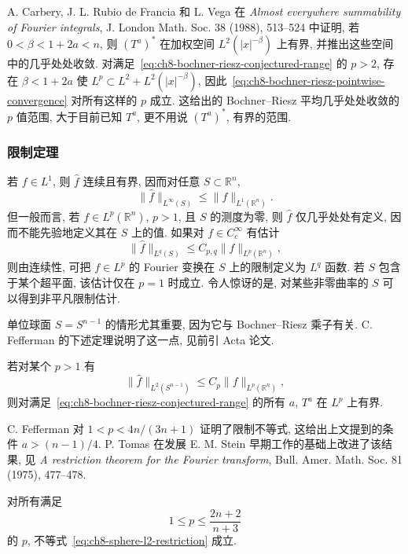 A. Carbery, J. L. Rubio de Francia 和 L. Vega 在 \textit{Almost everywhere summability of Fourier integrals}, J. London Math. Soc. 38 (1988), 513--524 中证明, 若 $0<\beta<1+2a<n$, 则 $(T^a)^*$ 在加权空间 $L^2(|x|^{-\beta})$ 上有界, 并推出这些空间中的几乎处处收敛. 对满足~\eqref{eq:ch8-bochner-riesz-conjectured-range} 的 $p>2$, 存在 $\beta<1+2a$ 使 $L^p\subset L^2+L^2(|x|^{-\beta})$, 因此~\eqref{eq:ch8-bochner-riesz-pointwise-convergence} 对所有这样的 $p$ 成立. 这给出的 Bochner--Riesz 平均几乎处处收敛的 $p$ 值范围, 大于目前已知 $T^a$, 更不用说 $(T^a)^*$, 有界的范围.

\subsubsection{限制定理}
\label{subsec:ch8-restriction-theorems}

若 $f\in L^1$, 则 $\widehat f$ 连续且有界, 因而对任意 $S\subset\mathbb R^n$,
\[
 \|\widehat f\|_{L^\infty(S)}\le\|f\|_{L^1(\mathbb R^n)}.
\]
但一般而言, 若 $f\in L^p(\mathbb R^n)$, $p>1$, 且 $S$ 的测度为零, 则 $\widehat f$ 仅几乎处处有定义, 因而不能先验地定义其在 $S$ 上的值. 如果对 $f\in C_c^\infty$ 有估计
\[
 \|\widehat f\|_{L^q(S)}\le C_{p,q}\|f\|_{L^p(\mathbb R^n)},
\]
则由连续性, 可把 $f\in L^p$ 的 Fourier 变换在 $S$ 上的限制定义为 $L^q$ 函数. 若 $S$ 包含于某个超平面, 该估计仅在 $p=1$ 时成立. 令人惊讶的是, 对某些非零曲率的 $S$ 可以得到非平凡限制估计.

\hypertarget{chapter-08-page-201}{}
单位球面 $S=S^{n-1}$ 的情形尤其重要, 因为它与 Bochner--Riesz 乘子有关. C. Fefferman 的下述定理说明了这一点, 见前引 Acta 论文.

\begin{Theorem}
\label{thm:ch8-restriction-implies-bochner-riesz}
若对某个 $p>1$ 有
\begin{equation}
 \|\widehat f\|_{L^2(S^{n-1})}
 \le C_p\|f\|_{L^p(\mathbb R^n)},
 \label{eq:ch8-sphere-l2-restriction}
\end{equation}
则对满足~\eqref{eq:ch8-bochner-riesz-conjectured-range} 的所有 $a$, $T^a$ 在 $L^p$ 上有界.
\end{Theorem}

C. Fefferman 对 $1<p<4n/(3n+1)$ 证明了限制不等式, 这给出上文提到的条件 $a>(n-1)/4$. P. Tomas 在发展 E. M. Stein 早期工作的基础上改进了该结果, 见 \textit{A restriction theorem for the Fourier transform}, Bull. Amer. Math. Soc. 81 (1975), 477--478.

\begin{Theorem}
\label{thm:ch8-tomas-stein}
对所有满足
\[
 1\le p\le\frac{2n+2}{n+3}
\]
的 $p$, 不等式~\eqref{eq:ch8-sphere-l2-restriction} 成立.
\end{Theorem}

